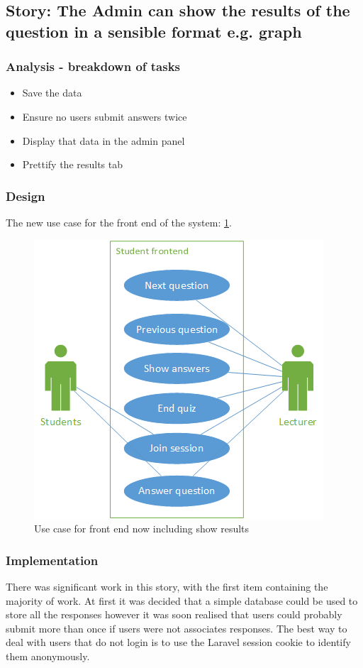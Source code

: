 \subsection{Story: The Admin can show the results of the question in a sensible format e.g. graph}
\subsubsection{Analysis - breakdown of tasks}
\begin{itemize}
	\item Save the data
	\item Ensure no users submit answers twice
	\item Display that data in the admin panel
	\item Prettify the results tab
\end{itemize}
\subsubsection{Design}
The new use case for the front end of the system: \ref{fig:iter-6-frontend-use-case}.
\begin{figure}
	\caption{Use case for front end now including show results}
	\centerline{\includegraphics{Chapter2/Iter-6/iter-6-frontend-use-case}}
	\label{fig:iter-6-frontend-use-case}
\end{figure}
\subsubsection{Implementation}
There was significant work in this story, with the first item containing the majority of work. At first it was decided that a simple database could be used to store all the responses however it was soon realised that users could probably submit more than once if users were not associates responses. The best way to deal with users that do not login is to use the Laravel session cookie to identify them anonymously.

